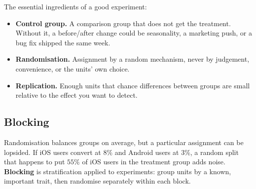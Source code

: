 The essential ingredients of a good experiment:
\begin{itemize}
  \item \textbf{Control group.} A comparison group that does not get the treatment.
  Without it, a before/after change could be seasonality, a marketing push, or a bug fix
  shipped the same week.
  \item \textbf{Randomisation.} Assignment by a random mechanism, never by judgement,
  convenience, or the units' own choice.
  \item \textbf{Replication.} Enough units that chance differences between groups are
  small relative to the effect you want to detect.
\end{itemize}

\subsection{Blocking}

Randomisation balances groups on average, but a particular assignment can be lopsided.
If iOS users convert at $8\%$ and Android users at $3\%$, a random split that happens to
put $55\%$ of iOS users in the treatment group adds noise. \textbf{Blocking} is
stratification applied to experiments: group units by a known, important trait, then
randomise separately within each block.

